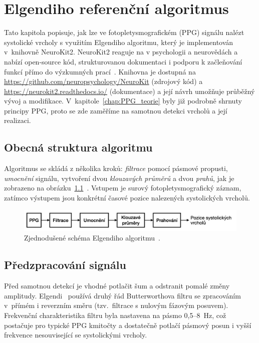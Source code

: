 \chapter{Elgendiho referenční algoritmus}
\label{chap:elgendi_neurokit}

Tato kapitola popisuje, jak lze ve fotopletysmografickém (\acs{PPG}) signálu nalézt systolické vrcholy s využitím Elgendiho algoritmu, který je implementován v~knihovně NeuroKit2.
NeuroKit2 reaguje na  v psychologii a neurovědách a nabízí open-source kód, strukturovanou dokumentaci i podporu k začleňování funkcí přímo do výzkumných prací~\cite{NeuroKit2}.
Knihovna je dostupná na \url{https://github.com/neuropsychology/NeuroKit} (zdrojový kód) a \url{https://neurokit2.readthedocs.io/} (dokumentace) a její návrh umožňuje průběžný vývoj a modifikace.
V~kapitole~\ref{chap:PPG_teorie} byly již podrobně shrnuty principy \acs{PPG}, proto se zde zaměříme na samotnou detekci vrcholů a její realizaci.

\section{Obecná struktura algoritmu}
Algoritmus se skládá z několika kroků: \emph{filtrace} pomocí pásmové propusti, \emph{umocnění} signálu, vytvoření dvou \emph{klouzavých průměrů} a dvou \emph{prahů}, jak je zobrazeno na obrázku~\ref{fig:alg-scheme}~\cite{Elgendi2013}.
Vstupem je surový fotopletysmografický záznam, zatímco výstupem jsou konkrétní časové pozice nalezených systolických vrcholů.

\begin{figure}[htbp]
	\centering
	\includegraphics[width=1\textwidth]{./obrazky/ElgendiBlokSchema.png}
	\caption[Struktura Elgendiho algoritmu]{Zjednodušené schéma Elgendiho algoritmu~\cite{Elgendi2013}.}
	\label{fig:alg-scheme}
\end{figure}

\section{Předzpracování signálu}
Před samotnou detekcí je vhodné potlačit šum a odstranit pomalé změny amplitudy.
Elgendi~\cite{Elgendi2013} používá druhý řád Butterworthova filtru se zpracováním v~přímém i reverzním směru (tzv.~filtrace s nulovým fázovým posuvem).
Frekvenční charakteristika filtru byla nastavena na pásmo 0,5--8~Hz, což postačuje pro typické PPG kmitočty a dostatečně potlačí pásmový posun i vyšší frekvence nesouvisející se systolickými vrcholy.

